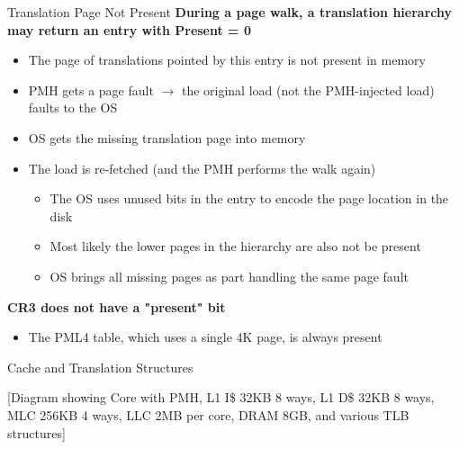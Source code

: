 \documentclass[aspectratio=169,12pt]{beamer}
\begin{document}
\begin{frame}{Translation Page Not Present}
\textbf{During a page walk, a translation hierarchy may return an entry with Present = 0}
\begin{itemize}
\item The page of translations pointed by this entry is not present in memory
\item PMH gets a page fault $\rightarrow$ the original load (not the PMH-injected load) faults to the OS
\item OS gets the missing translation page into memory
\item The load is re-fetched (and the PMH performs the walk again)
    \begin{itemize}
    \item The OS uses unused bits in the entry to encode the page location in the disk
    \item Most likely the lower pages in the hierarchy are also not be present
    \item OS brings all missing pages as part handling the same page fault
    \end{itemize}
\end{itemize}

\textbf{CR3 does not have a "present" bit}
\begin{itemize}
\item The PML4 table, which uses a single 4K page, is always present
\end{itemize}
\end{frame}

\begin{frame}{Cache and Translation Structures}
\begin{center}
[Diagram showing Core with PMH, L1 I\$ 32KB 8 ways, L1 D\$ 32KB 8 ways, MLC 256KB 4 ways, LLC 2MB per core, DRAM 8GB, and various TLB structures]
\end{center}
\end{frame}
\end{document}
